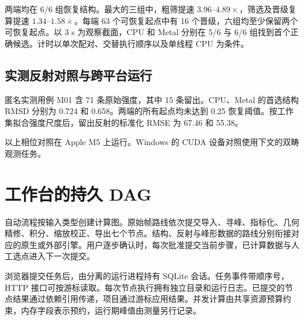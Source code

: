 \documentclass[11pt,a4paper,fontset=fandol,UTF8]{ctexart}
\newcommand{\capline}[1]{\medskip{\small\sffamily\color{muted}#1}\par\smallskip}
\begin{document}
两端均在 6/6 组恢复结构。最大的三组中，粗筛提速 \(3.96\)–\(4.89\times\)，筛选及晋级复算提速 \(1.34\)–\(1.58\times\)。每端 63 个可恢复起点中有 16 个晋级，六组均至少保留两个可恢复起点。以 3 s 为观察截面，CPU 和 Metal 分别在 5/6 与 6/6 组找到首个正确候选。计时以单次配对、交替执行顺序以及单线程 CPU 为条件。

\clearpage
\subsection*{实测反射对照与跨平台运行}
匿名实测用例 M01 含 71 条原始强度，其中 15 条留出。CPU、Metal 的首选结构 RMSD 分别为 \qty{0.724}{\angstromunit} 和 \qty{0.658}{\angstromunit}。两端的所有起点均未达到 \qty{0.25}{\angstromunit} 恢复阈值。按工作集拟合强度尺度后，留出反射的标准化 RMSE 为 67.46 和 55.38。

以上相位对照在 Apple M5 上运行。Windows 的 CUDA 设备对照使用下文的双畴观测任务。

\section{工作台的持久 DAG}

自动流程按输入类型创建计算图。原始帧路线依次提交导入、寻峰、指标化、几何精修、积分、缩放校正、导出七个节点。结构、反射与峰形数据的路线分别衔接对应的原生或外部引擎。用户逐步确认时，每次批准提交当前步骤，已计算数据与人工选点进入下一次提交。

\capline{图 2\quad 任一节点的执行和恢复路径}
\begin{center}
\end{center}

浏览器提交任务后，由分离的运行进程持有 SQLite 会话。任务事件带顺序号，HTTP 接口可按游标读取。每次节点执行拥有独立目录和运行日志。已提交的节点结果通过依赖引用传递，项目通过游标应用结果。并发计算由共享资源预算约束，内存字段表示预约，运行期峰值由测量另行记录。
\end{document}
